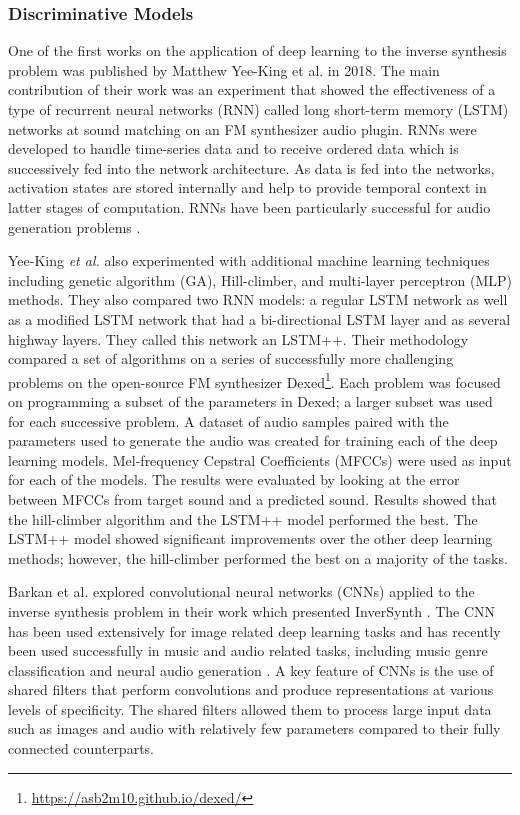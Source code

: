 \subsubsection{Discriminative Models}
One of the first works on the application of deep learning to the inverse synthesis problem was published by Matthew Yee-King et al. \cite{yee2018automatic} in 2018. The main contribution of their work was an experiment that showed the effectiveness of a type of recurrent neural networks (RNN) called long short-term memory (LSTM) networks at sound matching on an FM synthesizer audio plugin. RNNs were developed to handle time-series data and to receive ordered data which is successively fed into the network architecture. As data is fed into the networks, activation states are stored internally and help to provide temporal context in latter stages of computation. RNNs have been particularly successful for audio generation problems \cite{oord2016wavenet, engel2017neural}. 

Yee-King \textit{et al.} also experimented with additional machine learning techniques including genetic algorithm (GA), Hill-climber, and  multi-layer perceptron (MLP) methods. They also compared two RNN models: a regular LSTM network as well as a modified LSTM network that had a bi-directional LSTM layer and as several highway layers. They called this network an LSTM++. Their methodology compared a set of algorithms on a series of successfully more challenging problems on the open-source FM synthesizer Dexed\footnote{\url{https://asb2m10.github.io/dexed/}}. Each problem was focused on programming a subset of the parameters in Dexed; a larger subset was used for each successive problem. A dataset of audio samples paired with the parameters used to generate the audio was created for training each of the deep learning models. Mel-frequency Cepstral Coefficients (MFCCs) were used as input for each of the models. The results were evaluated by looking at the error between MFCCs from target sound and a predicted sound. Results showed that the hill-climber algorithm and the LSTM++ model performed the best. The LSTM++ model showed significant improvements over the other deep learning methods; however, the hill-climber performed the best on a majority of the tasks.

Barkan et al. explored convolutional neural networks (CNNs) applied to the inverse synthesis problem in their work which presented InverSynth \cite{barkan2019deep}. The CNN has been used extensively for image related deep learning tasks and has recently been used successfully in music and audio related tasks, including music genre classification \cite{choi2016automatic} and neural audio generation \cite{donahue2018adversarial}. A key feature of CNNs is the use of shared filters that perform convolutions and produce representations at various levels of specificity. The shared filters allowed them to process large input data such as images and audio with relatively few parameters compared to their fully connected counterparts. 

